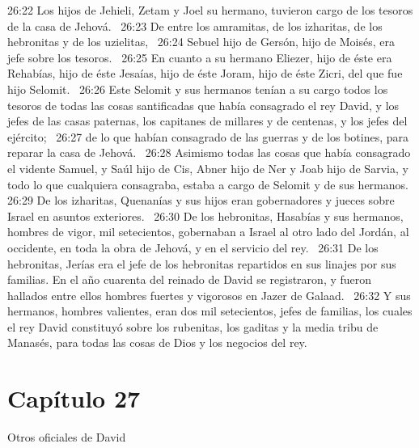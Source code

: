 26:22 Los hijos de Jehieli, Zetam y Joel su hermano, tuvieron cargo de los tesoros de la casa de Jehová.  
26:23 De entre los amramitas, de los izharitas, de los hebronitas y de los uzielitas,  
26:24 Sebuel hijo de Gersón, hijo de Moisés, era jefe sobre los tesoros.  
26:25 En cuanto a su hermano Eliezer, hijo de éste era Rehabías, hijo de éste Jesaías, hijo de éste Joram, hijo de éste Zicri, del que fue hijo Selomit.  
26:26 Este Selomit y sus hermanos tenían a su cargo todos los tesoros de todas las cosas santificadas que había consagrado el rey David, y los jefes de las casas paternas, los capitanes de millares y de centenas, y los jefes del ejército;  
26:27 de lo que habían consagrado de las guerras y de los botines, para reparar la casa de Jehová.  
26:28 Asimismo todas las cosas que había consagrado el vidente Samuel, y Saúl hijo de Cis, Abner hijo de Ner y Joab hijo de Sarvia, y todo lo que cualquiera consagraba, estaba a cargo de Selomit y de sus hermanos.  
26:29 De los izharitas, Quenanías y sus hijos eran gobernadores y jueces sobre Israel en asuntos exteriores.  
26:30 De los hebronitas, Hasabías y sus hermanos, hombres de vigor, mil setecientos, gobernaban a Israel al otro lado del Jordán, al occidente, en toda la obra de Jehová, y en el servicio del rey.  
26:31 De los hebronitas, Jerías era el jefe de los hebronitas repartidos en sus linajes por sus familias. En el año cuarenta del reinado de David se registraron, y fueron hallados entre ellos hombres fuertes y vigorosos en Jazer de Galaad.  
26:32 Y sus hermanos, hombres valientes, eran dos mil setecientos, jefes de familias, los cuales el rey David constituyó sobre los rubenitas, los gaditas y la media tribu de Manasés, para todas las cosas de Dios y los negocios del rey.  
\section*{Capítulo 27 }
Otros oficiales de David  

